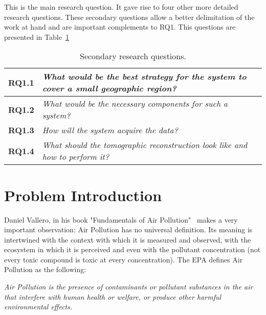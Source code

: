This is the main research question. It gave rise to four other more
detailed research questions. These secondary questions allow a better
delimitation of the work at hand and are important complements to RQ1.
This questions are presented in Table~\ref{tab:sec_RQ}

\begin{table}[htpb]
    \centering
    \caption{Secondary research questions.}
    \label{tab:sec_RQ}
    \begin{tabularx}{0.8\textwidth}{cX}
        \toprule
        \textbf{RQ1.1}&\emph{ What would be the best strategy
        for the system to cover a small geographic region? }\\
        \midrule
        \textbf{RQ1.2}&\emph{ What would be the necessary
        components for such a system? }\\
        \midrule
        \textbf{RQ1.3}&\emph{ How will the system acquire the
        data? }\\
        \midrule
        \textbf{RQ1.4}&\emph{ What should the tomographic
        reconstruction look like and how to perform it? }\\
        \bottomrule
    \end{tabularx}
\end{table}

\section{Problem Introduction}%
\label{sec:problem_introduction}

Daniel Vallero, in his book "Fundamentals of Air
Pollution"~\cite{Vallero2014} makes a very important observation: Air
Pollution has no universal definition. Its meaning is intertwined with
the context with which it is measured and observed, with the ecosystem
in which it is perceived and even with the pollutant concentration (not
every toxic compound is toxic at every concentration). The \gls{EPA}
defines Air Pollution as the following:

\begin{center}
    \begin{minipage}{0.8\textwidth}

        \noindent
            \textit{Air Pollution is the presence of contaminants or pollutant
            substances in the air that interfere with human health or welfare,
            or produce other harmful environmental effects.}

    \end{minipage}
\end{center}

